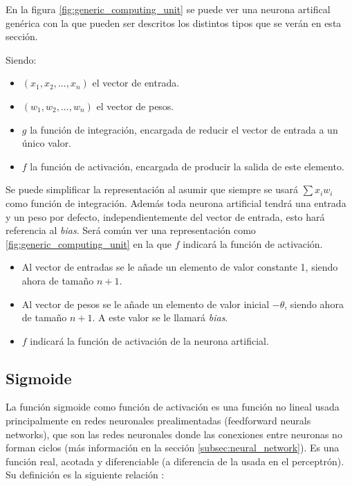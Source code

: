 En la figura \ref{fig:generic_computing_unit} se puede ver una neurona artifical genérica con la que pueden ser descritos los distintos tipos que se verán en esta sección.


Siendo:
\begin{itemize}
\item $ (x_1, x_2, ...,x_n) $ el vector de entrada.
\item $ (w_1, w_2, ...,w_n) $ el vector de pesos.
\item $ g $ la función de integración, encargada de reducir el vector de entrada a un único valor.
\item $ f $ la función de activación, encargada de producir la salida de este elemento.
\end{itemize}

Se puede simplificar la representación al asumir que siempre se usará $ \sum x_i w_i $ como función de integración. Además toda neurona artificial tendrá una entrada y un peso por defecto, independientemente del vector de entrada, esto hará referencia al \textit{bias}. Será común ver una representación como \ref{fig:generic_computing_unit} en la que $ f $ indicará la función de activación.


\begin{itemize}
\item Al vector de entradas se le añade un elemento de valor constante 1, siendo ahora de tamaño $ n+1 $.
\item Al vector de pesos se le añade un elemento de valor inicial $ -\theta $, siendo ahora de tamaño $ n+1 $. A este valor se le llamará \textit{bias}.
\item $ f $ indicará la función de activación de la neurona artificial.
\end{itemize}

\subsection{Sigmoide}\label{subsubsec:sigmoide}

La función sigmoide como función de activación es una función no lineal usada principalmente en redes neuronales prealimentadas (feedforward neurals networks), que son las redes neuronales donde las conexiones entre neuronas no forman ciclos (más información en la sección \ref{subsec:neural_network}). Es una función real, acotada y diferenciable (a diferencia de la usada en el perceptrón). Su definición es la siguiente relación \cite{nwankpa2018activation}:

